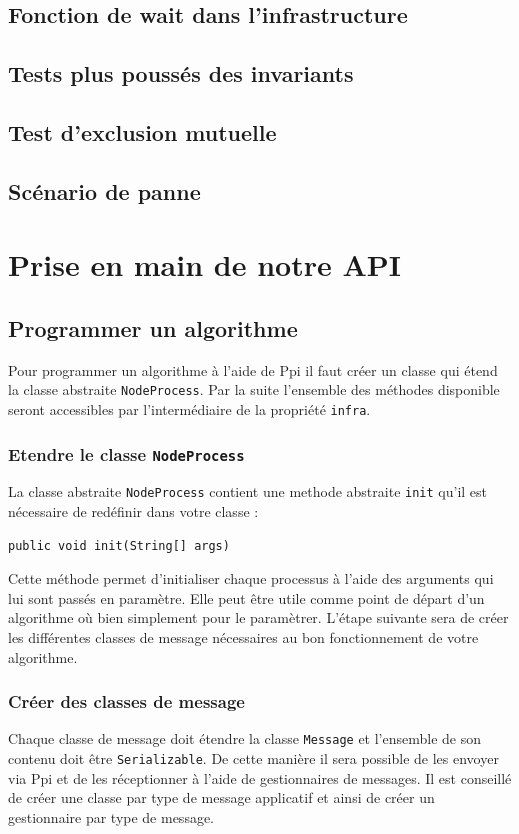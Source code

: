 \documentclass{article}
\begin{document}
			\subsection{Fonction de wait dans l'infrastructure}		
			\subsection{Tests plus poussés des invariants}
			\subsection{Test d'exclusion mutuelle}
			\subsection{Scénario de panne}
		
		\newpage
		\section{Prise en main de notre API}

		\subsection{Programmer un algorithme}
		Pour programmer un algorithme à l'aide de Ppi il faut créer un classe qui étend la classe abstraite \lstinline{NodeProcess}. Par la suite l'ensemble des méthodes disponible seront accessibles par l'intermédiaire de la propriété \lstinline{infra}.

		\subsubsection{Etendre le classe \lstinline{NodeProcess}}
		La classe abstraite \lstinline{NodeProcess} contient une methode abstraite \lstinline{init}
		qu'il est nécessaire de redéfinir dans votre classe :
		\begin{lstlisting}
public void init(String[] args)
		\end{lstlisting}
		Cette méthode permet d'initialiser chaque processus à l'aide des arguments qui lui sont
		passés en paramètre. Elle peut être utile comme point de départ d'un algorithme où bien
		simplement pour le paramètrer.
		L'étape suivante sera de créer les différentes classes de message nécessaires au bon
		fonctionnement de votre algorithme.

		\subsubsection{Créer des classes de message}
		Chaque classe de message doit étendre la classe \lstinline{Message} et l'ensemble de son
		contenu doit être \lstinline{Serializable}. De cette manière il sera possible de les envoyer
		via Ppi et de les réceptionner à l'aide de gestionnaires de messages. Il est conseillé de
		créer une classe par type de message applicatif et ainsi de créer un gestionnaire par type
		de message.
\end{document}

